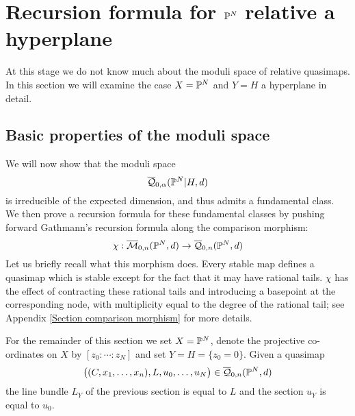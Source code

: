 \section{Recursion formula for $\mathbb P^N$ relative a hyperplane} \label{Section recursion for PN}
At this stage we do not know much about the moduli space of relative quasimaps. In this section we will examine the case $X=\mathbb P^N$ and $Y=H$ a hyperplane in detail.

\subsection{Basic properties of the moduli space} \label{Subsection basic properties of the moduli space}
We will now show that the moduli space
\begin{equation*} \overline{\mathcal Q}_{0,\alpha}(\mathbb P^N|H,d) \end{equation*}
is irreducible of the expected dimension, and thus admits a fundamental class. We then prove a recursion formula for these fundamental classes by pushing forward Gathmann's recursion formula along the comparison morphism:
\begin{equation*}\chi : \overline{\mathcal M}_{0,n}(\mathbb P^N,d) \rightarrow \overline{\mathcal Q}_{0,n}(\mathbb P^N,d) \end{equation*}
Let us briefly recall what this morphism does. Every stable map defines a quasimap which is stable except for the fact that it may have rational tails. $\chi$ has the effect of contracting these rational tails and introducing a basepoint at the corresponding node, with multiplicity equal to the degree of the rational tail; see Appendix \ref{Section comparison morphism} for more details.

For the remainder of this section we set $X=\mathbb P^N$, denote the projective co-ordinates on $X$ by $[z_0: \cdots: z_N]$ and set $Y=H=\{ z_0 = 0 \}$. Given a quasimap
\begin{equation*} \big((C,x_1,\ldots,x_n), L, u_0,\ldots,u_N\big) \in \overline{\mathcal Q}_{0,n}(\mathbb P^N,d) \end{equation*}
the line bundle $L_Y$ of the previous section is equal to $L$ and the section $u_Y$ is equal to $u_0$.

